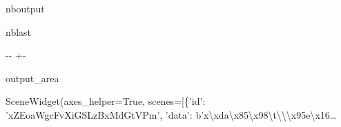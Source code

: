 \documentclass[letterpaper,10pt,english]{sphinxmanual}
\begin{document}
\begin{sphinxuseclass}{nboutput}
\begin{sphinxuseclass}{nblast}
{

\kern-\sphinxverbatimsmallskipamount\kern-\baselineskip
\kern+\FrameHeightAdjust\kern-\fboxrule
\vspace{\nbsphinxcodecellspacing}

\begin{sphinxuseclass}{output_area}
\begin{sphinxuseclass}{}


\begin{sphinxVerbatim}[commandchars=\\\{\}]
\llap{\color{nbsphinxout}[18]:\,\hspace{\fboxrule}\hspace{\fboxsep}}SceneWidget(axes\_helper=True, scenes=[\{'id': 'xZEoaWgcFvXiGSLzBxMdGtVPm', 'data': b'x\textbackslash{}xda\textbackslash{}x85\textbackslash{}x98\textbackslash{}t\textbackslash{}\textbackslash{}\textbackslash{}x95e\textbackslash{}x16…
\end{sphinxVerbatim}



\end{sphinxuseclass}
\end{sphinxuseclass}
}

\end{sphinxuseclass}
\end{sphinxuseclass}
\end{document}
